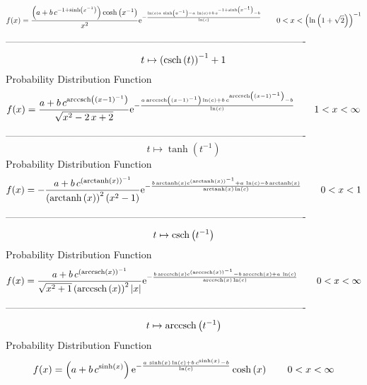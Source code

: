 \documentclass[12pt]{article}
\begin{document}
$$  f(x)={\frac { \left( a+b\,{c}^{-1+\sinh \left( {x}^{-1} \right) } \right) 
\cosh \left( {x}^{-1} \right) }{{x}^{2}}{{\rm e}^{-{\frac {\ln 
 \left( c \right) a\,\sinh \left( {x}^{-1} \right) -a\,\ln  \left( c
 \right) +b\,{c}^{-1+\sinh \left( {x}^{-1} \right) }-b}{\ln  \left( c
 \right) }}}}}
 \qquad0
 < x <  \left( \ln  \left( 1+\sqrt {2} \right)  \right) ^{-1}
$$-------------------------------------------------------------------------------------------  \\$$t\mapsto  \left( {\rm csch} \left(t\right) \right) ^{-1}+1
$$Probability Distribution Function 
$$  f(x)={\frac {a+b\,{c}^{{\rm arccsch} \left( \left( x-1 \right) ^{-1}\right)
}}{\sqrt {{x}^{2}-2\,x+2}}{{\rm e}^{-{\frac {a\,{\rm arccsch} \left(
 \left( x-1 \right) ^{-1}\right)\ln  \left( c \right) +b\,{c}^{
{\rm arccsch} \left( \left( x-1 \right) ^{-1}\right)}-b}{\ln  \left( c
 \right) }}}}}
 \qquad1
 < x < \infty 
$$-------------------------------------------------------------------------------------------  \\$$t\mapsto \tanh \left( {t}^{-1} \right) 
$$Probability Distribution Function 
$$  f(x)=-{\frac {a+b\,{c}^{ \left( {\rm arctanh} \left(x\right) \right) ^{-1}}
}{ \left( {\rm arctanh} \left(x\right) \right) ^{2} \left( {x}^{2}-1
 \right) }{{\rm e}^{-{\frac {b\,{\rm arctanh} \left(x\right){c}^{
 \left( {\rm arctanh} \left(x\right) \right) ^{-1}}+a\,\ln  \left( c
 \right) -b\,{\rm arctanh} \left(x\right)}{{\rm arctanh} \left(x
\right)\ln  \left( c \right) }}}}}
 \qquad0
 < x < 1
$$-------------------------------------------------------------------------------------------  \\$$t\mapsto {\rm csch} \left({t}^{-1}\right)
$$Probability Distribution Function 
$$  f(x)={\frac {a+b\,{c}^{ \left( {\rm arccsch} \left(x\right) \right) ^{-1}}
}{\sqrt {{x}^{2}+1} \left( {\rm arccsch} \left(x\right) \right) ^{2}
 \left| x \right| }{{\rm e}^{-{\frac {b\,{\rm arccsch} \left(x\right){
c}^{ \left( {\rm arccsch} \left(x\right) \right) ^{-1}}-b\,
{\rm arccsch} \left(x\right)+a\,\ln  \left( c \right) }{{\rm arccsch} 
\left(x\right)\ln  \left( c \right) }}}}}
 \qquad0
 < x < \infty 
$$-------------------------------------------------------------------------------------------  \\$$t\mapsto {\rm arccsch} \left({t}^{-1}\right)
$$Probability Distribution Function 
$$  f(x)= \left( a+b\,{c}^{\sinh \left( x \right) } \right) {{\rm e}^{-{\frac {
a\,\sinh \left( x \right) \ln  \left( c \right) +b\,{c}^{\sinh \left( 
x \right) }-b}{\ln  \left( c \right) }}}}\cosh \left( x \right) 
 \qquad0
 < x < \infty 
$$
\end{document}
